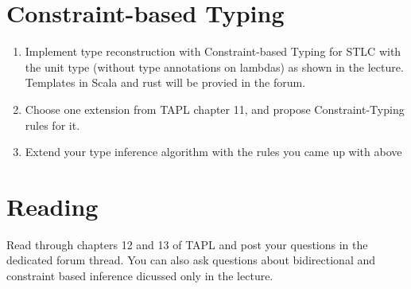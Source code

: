 \section{Constraint-based Typing}

\begin{enumerate}
  \item Implement type reconstruction with Constraint-based Typing for STLC with the unit type 
    (without type annotations on lambdas) as shown in the lecture.
    Templates in Scala and rust will be provied in the forum.
  \item Choose one extension from TAPL chapter 11, and propose Constraint-Typing rules for it.
  \item Extend your type inference algorithm with the rules you came up with above
\end{enumerate}

\section{Reading}
Read through chapters 12 and 13 of TAPL and post your questions in the dedicated forum thread. 
You can also ask questions about bidirectional and constraint based inference dicussed only in the lecture.
